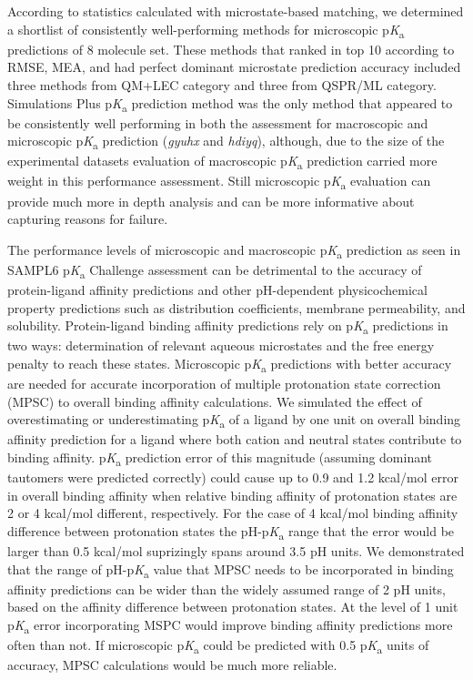 \documentclass[9pt,lineno,final]{elife}
\newcommand{\pKa}{p\textit{K}\textsubscript{a}}
\begin{document}
According to statistics calculated with microstate-based matching, we determined a shortlist of consistently well-performing methods for microscopic \pKa{} predictions of 8 molecule set. These methods that ranked in top 10 according to RMSE, MEA, and had perfect dominant microstate prediction accuracy included three methods from QM+LEC category and three from QSPR/ML category. Simulations Plus \pKa{} prediction method was the only method that appeared to be consistently well performing in both the assessment for macroscopic and microscopic \pKa{} prediction (\textit{gyuhx} and \textit{hdiyq}), although, due to the size of the experimental datasets evaluation of macroscopic \pKa{} prediction carried more weight in this performance assessment. Still microscopic \pKa{} evaluation can provide much more in depth analysis and can be more informative about capturing reasons for failure.

The performance levels of microscopic and macroscopic \pKa{} prediction as seen in SAMPL6 \pKa{} Challenge assessment can be detrimental to the accuracy of protein-ligand affinity predictions and other pH-dependent physicochemical property predictions such as distribution coefficients, membrane permeability, and solubility.
Protein-ligand binding affinity predictions rely on \pKa{} predictions in two ways: determination of relevant aqueous microstates and the free energy penalty to reach these states. Microscopic \pKa{} predictions with better accuracy are needed for accurate incorporation of multiple protonation state correction (MPSC) to overall binding affinity calculations. We simulated the effect of overestimating or underestimating \pKa{} of a ligand by one unit on overall binding affinity prediction for a ligand where both cation and neutral states contribute to binding affinity. 
\pKa{} prediction error of this magnitude (assuming dominant tautomers were predicted correctly) could cause up to 0.9 and 1.2 kcal/mol error in overall binding affinity when relative binding affinity of protonation states are 2 or 4 kcal/mol different, respectively. 
For the case of 4 kcal/mol binding affinity difference between protonation states the pH-\pKa{} range that the error would be larger than 0.5 kcal/mol suprizingly spans around 3.5 pH units. We demonstrated that the range of pH-\pKa{} value that MPSC needs to be incorporated in binding affinity predictions can be wider than the widely assumed range of 2 pH units, based on the affinity difference between protonation states. At the level of 1 unit \pKa{} error incorporating MSPC would improve binding affinity predictions more often than not. If microscopic \pKa{} could be predicted with 0.5 \pKa{} units of accuracy, MPSC calculations would be much more reliable.
\end{document}
